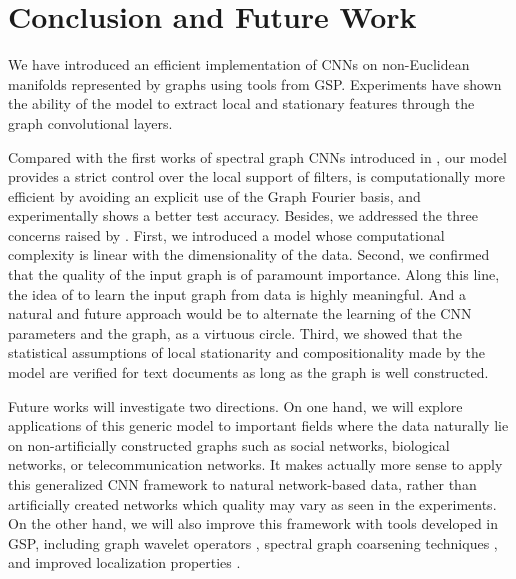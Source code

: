 \documentclass{article}
\newcommand{\bruna}{art:BrunaZarembaSzlamLeCun13DLgraphs,
art:HenaffBrunaLeCun15DLgraphs}
\begin{document}
\section{Conclusion and Future Work}

We have introduced an efficient implementation of CNNs on non-Euclidean
manifolds represented by graphs using tools from GSP. Experiments have shown the
ability of the model to extract local and stationary features through the graph
convolutional layers. 


Compared with the first works of spectral graph CNNs
introduced in \cite{\bruna}, our model provides a strict control over the local
support of filters, is computationally more efficient by
avoiding an explicit use of the Graph Fourier basis, and experimentally shows a
better test accuracy. Besides, we addressed the three concerns raised by
\cite{art:HenaffBrunaLeCun15DLgraphs}. First, we introduced a model whose computational complexity is linear with the
dimensionality of the data. Second, we confirmed that the quality of the input graph is of paramount importance. Along this line, the idea of \cite{art:HenaffBrunaLeCun15DLgraphs} to learn the input graph from data is highly meaningful. And a natural and future approach would be to alternate the learning of the CNN parameters and the graph, as a virtuous circle. Third, we showed that the statistical assumptions of local stationarity and compositionality made by the model are verified for text documents as long as the graph is well constructed.


Future works will investigate two directions. On one hand, we will explore
applications of this generic model to important fields where the data naturally
lie on non-artificially constructed graphs such as social networks, biological
networks, or telecommunication networks. It makes actually more sense to apply
this generalized CNN framework to natural network-based data, rather than
artificially created networks which quality may vary as seen in the experiments.
On the other hand, we will also improve this framework with tools developed in GSP,
including graph wavelet operators
\cite{art:HammondVandergheynstGribonval11GraphWav, art:CoifmanLafon06DifMap,
	pro:GavishNadlerCoifman10GraphHaar, pro:ChenChengMallat14deepHaar,
	pro:RustamovGuibas14deepHaar}, spectral graph coarsening techniques
	\cite{art:ShumanFarajiVandergheynst16PyramTrans}, and improved localization
	properties \cite{pro:TsitsveroBarbarossa15Uncert,
	pro:PasdeloupAlamiGriponRabbat15Uncert,
art:PerraudinRicaudShumanVandergheynst16Uncert}.
\end{document}
